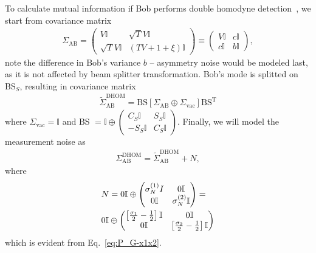 \documentclass[%
reprint,
superscriptaddress,
 amsmath,amssymb,amsfonts,
 aps,
 pra,
 longbibliography
]{revtex4-2}
\newcommand{\ind}[1]{\mathrm{#1}}
\begin{document}
To calculate mutual information if Bob performs double homodyne 
detection~\cite{PhysRevLett.93.170504}, we start from covariance matrix 
\begin{align}
  \label{eq:sigma_ab_nonoise}
\Sigma_{\ind{AB}}=\begin{pmatrix}
        V\mathbb{I}&\sqrt TV\mathbb{I}\\
        \sqrt TV\mathbb{I}&\left(TV+1+\xi\right)\mathbb{I}
    \end{pmatrix}\equiv \begin{pmatrix}
    V\mathbb{I}&c\mathbb{I}\\
        c\mathbb{I}&b\mathbb{I}
    \end{pmatrix}
    ,
\end{align}
note the difference in Bob's variance $b$ -- asymmetry noise would be modeled last, as it is not affected by beam splitter transformation.
Bob's mode is splitted on BS$_S$, resulting in covariance matrix
\begin{align}
    \label{eq:tilde-sigma}
    \tilde\Sigma_{\ind{AB}}^{\ind{DHOM}}=\ind{BS}\left[\Sigma_{\ind {AB}}\oplus \Sigma_{\ind{\ind{vac}}}\right]\ind{BS}^{\ind{T}}
\end{align}
where $\Sigma_{\ind{\ind{vac}}}=\mathbb{I}$ and BS $=\mathbb{I}\oplus    \begin{pmatrix}
    C_S\mathbb{I}& S_S\mathbb{I}\\
    -S_S\mathbb{I}&C_S\mathbb{I}
\end{pmatrix}$.
Finally, we will model the measurement noise as
\begin{align}
  \label{eq:sigma_ab_dhom}
    \Sigma_{\ind{AB}}^{\ind{DHOM}}=\tilde\Sigma_{\ind{AB}}^{\ind{DHOM}}+ N,
\end{align}
where
\begin{align}
\label{eq:N}
    &N=0\mathbb{I}\oplus\begin{pmatrix}
        \sigma_N^{(1)}{I}&0\mathbb{I}\\
        0\mathbb{I}&\sigma_N^{(2)}\mathbb{I}
    \end{pmatrix}=\notag\\&0\mathbb{I}\oplus\begin{pmatrix}
        \left[\frac{\sigma_1}2-\frac{1}{2}\right]\mathbb{I}&0\mathbb{I}\\
        0\mathbb{I}&\left[\frac{\sigma_2}2-\frac{1}{2}\right]\mathbb{I}
    \end{pmatrix}
\end{align}
which is evident from Eq.~\eqref{eq:P_G-x1x2}.
\end{document}
